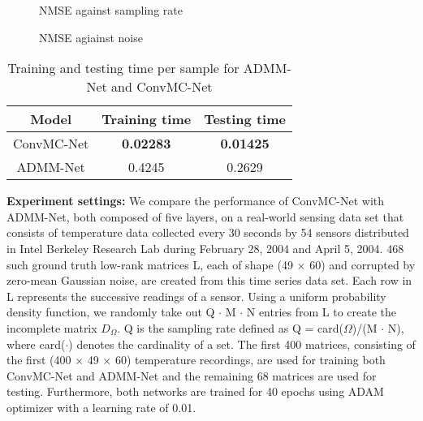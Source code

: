 
\begin{figure}[htbp]
    \centering
    
    \caption{NMSE against sampling rate}
    \label{fig:samplingrate}
\end{figure}

\begin{figure}[htbp]
    \centering
    
    \caption{NMSE agiainst noise}
    \label{fig:background_mag}
\end{figure}

\begin{table}[htbp]
    \centering
    \begin{tabular}{ccc}
        \toprule
        \textbf{Model} & \textbf{Training time} & \textbf{Testing time} \\
        \midrule
        ConvMC-Net & \textbf{0.02283} & \textbf{0.01425} \\
        ADMM-Net & 0.4245 & 0.2629 \\
        \bottomrule
    \end{tabular}
    \caption{Training and testing time per sample for ADMM-Net and ConvMC-Net}
    \label{tab:time}
\end{table}

\textbf{Experiment settings:} We compare the performance of ConvMC-Net with ADMM-Net, both composed of five layers, on a real-world sensing data set that consists of temperature data collected every 30 seconds by 54 sensors distributed in Intel Berkeley Research Lab during February 28, 2004 and April 5, 2004. 468 such ground truth low-rank matrices L, each of shape (49 \(\times\) 60) and corrupted by zero-mean Gaussian noise, are created from this time series data set. Each row in L represents the successive readings of a sensor. Using a uniform probability density function, we randomly take out Q \(\cdot\) M \(\cdot\) N entries from L to create the incomplete matrix \(D_\Omega\). Q is the sampling rate defined as Q = card(\(\Omega\))/(M \(\cdot\) N), where card(\(\cdot\)) denotes the cardinality of a set. The first 400 matrices, consisting of the first (400 \(\times\) 49 \(\times\) 60) temperature recordings, are used for training both ConvMC-Net and ADMM-Net and the remaining 68 matrices are used for testing. Furthermore, both networks are trained for 40 epochs using ADAM optimizer with a learning rate of 0.01.

